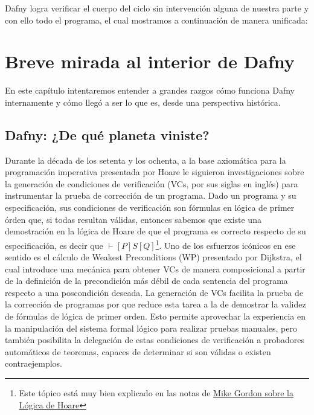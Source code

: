 \documentclass[12pt, a4paper, openany, fleqn]{book}
\begin{document}
    Dafny logra verificar el cuerpo del ciclo sin intervención alguna de nuestra parte y con ello todo el programa, el cual mostramos a continuación de manera unificada:

    \begin{greenbox}
    \end{greenbox}
    \chapter{Breve mirada al interior de Dafny} \label{ch:pipeline-dafny}

    En este capítulo intentaremos entender a grandes razgos cómo funciona Dafny internamente y cómo llegó a ser lo que es, desde una perspectiva histórica.

    \section{Dafny: ¿De qué planeta viniste?}
    Durante la década de los setenta y los ochenta, a la base axiomática para la programación imperativa presentada por Hoare\cite{10.1145/363235.363259} le siguieron investigaciones sobre la generación de condiciones de verificación (VCs, por sus siglas en inglés) para instrumentar la prueba de corrección de un programa. Dado un programa y su especificación, sus condiciones de verificación son fórmulas en lógica de primer órden que, si todas resultan válidas, entonces sabemos que existe una demostración en la lógica de Hoare de que el programa es correcto respecto de su especificación, es decir que $\vdash[P]S[Q]$\footnote{Este tópico está muy bien explicado en las notas de \href{https://www.cl.cam.ac.uk/archive/mjcg/HL/Notes/Notes.pdf}{Mike Gordon sobre la Lógica de Hoare}}. Uno de los esfuerzos icónicos en ese sentido es el cálculo de Weakest Preconditions (WP) presentado por Dijkstra\cite{EWD:EWD418}, el cual introduce una mecánica para obtener VCs de manera composicional a partir de la definición de la precondición más débil de cada sentencia del programa respecto a una poscondición deseada.
    La generación de VCs facilita la prueba de la corrección de programas por que reduce esta tarea a la de demostrar la validez de fórmulas de lógica de primer orden. Esto permite aprovechar la experiencia en la manipulación del sistema formal lógico para realizar pruebas manuales, pero también posibilita la delegación de estas condiciones de verificación a probadores automáticos de teoremas, capaces de determinar si son válidas o existen contraejemplos.
\end{document}
